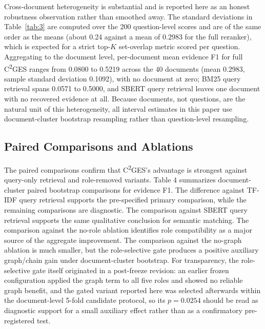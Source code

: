 \documentclass{ieeeaccess}
\begin{document}
Cross-document heterogeneity is substantial and is reported here as an honest robustness observation rather than smoothed away. The standard deviations in Table~\ref{tab:3} are computed over the 200 question-level scores and are of the same order as the means (about 0.24 against a mean of 0.2983 for the full reranker), which is expected for a strict top-\(K\) set-overlap metric scored per question. Aggregating to the document level, per-document mean evidence F1 for full C\textsuperscript{2}GES ranges from 0.0800 to 0.5219 across the 40 documents (mean 0.2983, sample standard deviation 0.1092), with no document at zero; BM25 query retrieval spans 0.0571 to 0.5000, and SBERT query retrieval leaves one document with no recovered evidence at all. Because documents, not questions, are the natural unit of this heterogeneity, all interval estimates in this paper use document-cluster bootstrap resampling rather than question-level resampling.

\subsection{Paired Comparisons and Ablations}

\label{sec:paired_comparisons_and_ablations}

The paired comparisons confirm that C\textsuperscript{2}GES's advantage is strongest against query-only retrieval and role-removed variants. Table 4 summarizes document-cluster paired bootstrap comparisons for evidence F1. The difference against TF-IDF query retrieval supports the pre-specified primary comparison, while the remaining comparisons are diagnostic. The comparison against SBERT query retrieval supports the same qualitative conclusion for semantic matching. The comparison against the no-role ablation identifies role compatibility as a major source of the aggregate improvement. The comparison against the no-graph ablation is much smaller, but the role-selective gate produces a positive auxiliary graph/chain gain under document-cluster bootstrap. For transparency, the role-selective gate itself originated in a post-freeze revision: an earlier frozen configuration applied the graph term to all five roles and showed no reliable graph benefit, and the gated variant reported here was selected afterwards within the document-level 5-fold candidate protocol, so its \(p=0.0254\) should be read as diagnostic support for a small auxiliary effect rather than as a confirmatory pre-registered test.
\end{document}
